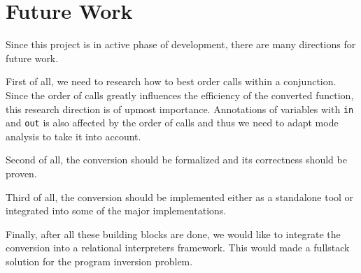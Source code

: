 \section{Future Work}

Since this project is in active phase of development, there are many directions for future work.

First of all, we need to research how to best order calls within a conjunction.
Since the order of calls greatly influences the efficiency of the converted function, this research direction is of upmost importance.
Annotations of variables with \lstinline{in} and \lstinline{out} is also affected by the order of calls and thus we need to adapt mode analysis to take it into account.

Second of all, the conversion should be formalized and its correctness should be proven.

Third of all, the conversion should be implemented either as a standalone tool or  integrated into some of the major \mk implementations.

Finally, after all these building blocks are done, we would like to integrate the conversion into a relational interpreters framework.
This would made a fullstack solution for the program inversion problem.